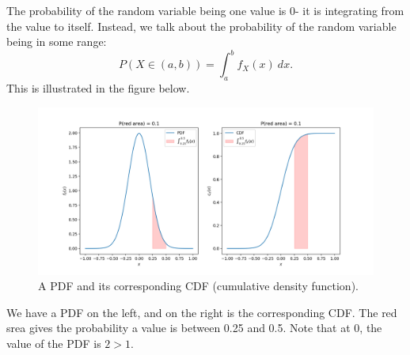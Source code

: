 \documentclass[a4paper, openany]{memoir}
\begin{document}
The probability of the random variable being one value is 0- it is integrating from the value to itself. Instead, we talk about the probability of the random variable being in some range:
\[P(X \in (a, b)) = \int_a^b f_X(x) \ dx.\]
This is illustrated in the figure below.
\begin{figure}[H]
    \centering
    \includegraphics[scale=0.38]{src/5.12 pdf cdf.png}
    \caption{A PDF and its corresponding CDF (cumulative density function).}
\end{figure}
\noindent We have a PDF on the left, and on the right is the corresponding CDF. The red srea gives the probability a value is between 0.25 and 0.5. Note that at 0, the value of the PDF is $2 > 1$.
\end{document}
